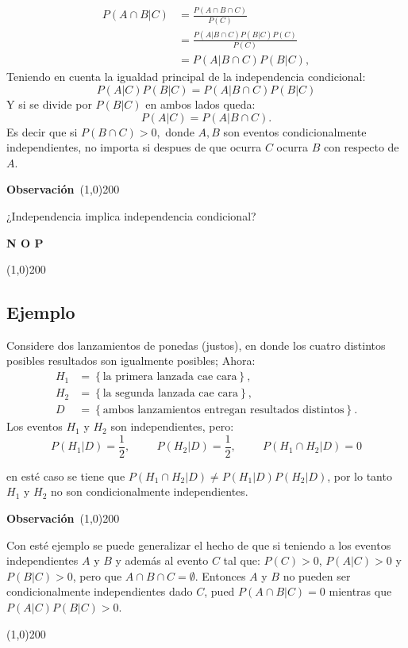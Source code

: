 \documentclass[a4paper,dvipsnames]{book}
\newenvironment{obs}
    {
        \begin{flushleft}
       \textbf{Observación}\
        \line(1,0){200} \
        \end{flushleft}
    }
    {
        \begin{flushright}
        \line(1,0){200}
        \end{flushright}
    }
\begin{document}
\begin{align*}
    P\left(A\cap B|C\right)&=\frac{P\left(A\cap B\cap C\right)}{P\left(C\right)}\\
             &=\frac{P\left(A|B\cap C\right)P\left(B|C\right)P\left(C\right)}{P\left(C\right)}\\
             &=P\left(A|B\cap C\right)P\left(B|C\right),
\end{align*}
Teniendo en cuenta la igualdad principal de la independencia condicional:
\[ P\left(A|C\right)P\left(B|C\right)=P\left(A|B\cap C\right)P\left(B|C\right)\]
Y si se divide por \(P\left(B|C\right)\) en ambos lados queda:
\[ P\left(A|C\right)=P\left(A|B\cap C\right) .\]
    Es decir que si \(P\left(B\cap C\right)>0,\) donde \(A,B\) son eventos
    condicionalmente independientes, no importa si despues de que ocurra \(C\)
    ocurra \(B\) con respecto de \(A\).

\begin{obs}
    ¿Independencia implica independencia condicional?
    \begin{center}
        {\color{OrangeRed} \textbf{N O P}}
    \end{center}
\end{obs}

\subsection{Ejemplo}

Considere dos lanzamientos de ponedas (justos), en donde los cuatro distintos posibles resultados son igualmente posibles; Ahora:
\begin{align*}
    H_1&=\left\{\text{la primera lanzada cae cara}\right\},\\
    H_2&=\left\{\text{la segunda lanzada cae cara}\right\},\\
    D &=\left\{\text{ambos lanzamientos entregan resultados distintos}\right\}.
\end{align*}
Los eventos \(H_1\) y \(H_2\) son independientes, pero:
\[P\left(H_1|D\right)=\frac{1}{2},\hspace{1cm}
P\left(H_2|D\right)=\frac{1}{2},\hspace{1cm}
P\left(H_1\cap H_2|D\right)=0\]

en esté caso se tiene que \(P\left(H_1\cap H_2|D\right)\neq
P\left(H_1|D\right)P\left(H_2|D\right)\), por lo tanto \(H_1\) y \(H_2\)
{\color{RedViolet} no son condicionalmente independientes}.

\begin{obs}
Con esté ejemplo se puede generalizar el hecho de que si teniendo a los eventos
independientes \(A\) y \(B\) y además al evento \(C\) tal que:
\(P\left(C\right)>0\), \(P\left(A|C\right)>0\) y \(P\left(B|C\right)>0\), pero
que \(A\cap B\cap C=\emptyset\). Entonces \(A\) y \(B\) no pueden ser
condicionalmente independientes dado \(C\), pued \(P\left(A\cap B|C\right)=0\)
mientras que \(P\left(A|C\right)P\left(B|C\right)>0\).
\end{obs}
\end{document}

